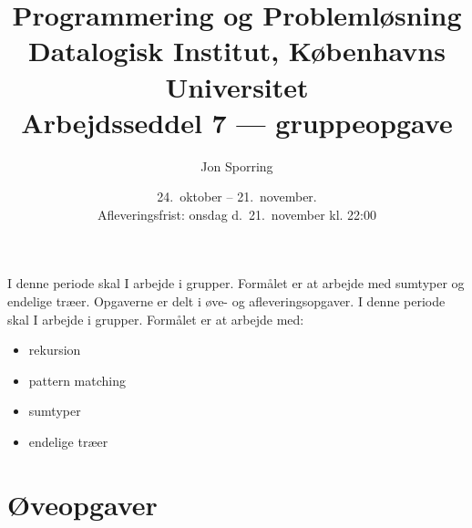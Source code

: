 \documentclass[a4paper,12pt]{article}
\title{Programmering og Problemløsning\\Datalogisk Institut,
  Københavns Universitet\\Arbejdsseddel 7 --- gruppeopgave}
\author{Jon Sporring}
\date{24.\ oktober -- 21.\ november.\\Afleveringsfrist: onsdag d.\ 21.\ november kl. 22:00}
\begin{document}
\maketitle

I denne periode skal I arbejde i grupper.  Formålet er at arbejde med
sumtyper og endelige træer. Opgaverne er delt i øve- og
afleveringsopgaver.
\noindent
I denne periode skal I arbejde i grupper. Formålet er at arbejde med:
\begin{itemize}
\item rekursion
\item pattern matching
\item sumtyper
\item endelige træer
\end{itemize}


\section*{Øveopgaver}
\end{document}

